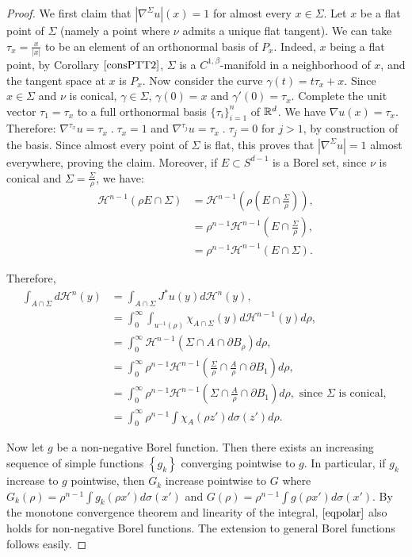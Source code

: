 \documentclass[11pt]{article}
\theoremstyle{definition}
\theoremstyle{remark}
\numberwithin{equation}{section}
\begin{document}
\begin{proof}
We first claim that $|\nabla^{\Sigma}u|(x)=1$ for almost every $x \in \Sigma$. Let $x$ be a flat point of $\Sigma$ (namely a point where $\nu$ admits a unique flat tangent). We can take $\tau_x=\frac{x}{|x|}$ to be an element of an orthonormal basis of $P_x$. Indeed, $x$ being a flat point, by Corollary $\ref{consPTT2}$, $\Sigma$ is a $C^{1,\beta}$-manifold in a neighborhood of $x$, and the tangent space at $x$ is $P_x$. 
Now consider the curve $\gamma(t)=t \tau_x +x$. 
Since $x \in \Sigma$ and $\nu$ is conical, $\gamma \in \Sigma$, $\gamma(0)=x$ and $\gamma'(0)=\tau_x$.
Complete the unit vector $\tau_1=\tau_{x}$ to a full orthonormal basis $\{\tau_i\}_{i=1}^{n}$ of $\mathbb{R}^{d}$. We have $\nabla u(x)= \tau_x$. Therefore: $\nabla^{\tau_x} u = \tau_x \;.\; \tau_x =1$ and $\nabla^{\tau_j} u = \tau_x \; . \; \tau_j = 0$ for $j>1$, by construction of the basis.  Since almost every point of $\Sigma$ is flat, this proves that $|\nabla^{\Sigma}u|= 1$ almost everywhere, proving the claim.
 Moreover, if $E \subset S^{d-1}$ is a Borel set, since $\nu$ is conical and $\Sigma= \frac{\Sigma}{\rho}$, we have:
 \begin{align}\label{Hausdorffdilation}
 \mathcal{H}^{n-1}(\rho E \cap \Sigma) & = \mathcal{H}^{n-1}\left(\rho\left(E \cap \frac{\Sigma}{\rho}\right)\right), \nonumber \\
 &=\rho^{n-1} \mathcal{H}^{n-1}\left(E \cap \frac{\Sigma}{\rho}\right), \\
 &= \rho^{n-1} \mathcal{H}^{n-1}\left(E \cap \Sigma\right). \nonumber
 \end{align}
 
Therefore,
\begin{align}
\label{polarsubstep1.1}
\int_{A \cap \Sigma}  d\mathcal{H}^{n}(y)
&=\int_{A \cap \Sigma} J^{*}u(y) d\mathcal{H}^{n}(y), \nonumber\\
& =\int_{0}^{\infty}  \int_{u^{-1}(\rho)} \chi_{A \cap \Sigma}(y) d\mathcal{H}^{n-1} (y) d\rho \nonumber,\\
&=\int_{0}^{\infty} \mathcal{H}^{n-1}(\Sigma \cap A \cap {{\partial B}_{\rho}}) d\rho,\\
&=\int_{0}^{\infty} \rho^{n-1} \mathcal{H}^{n-1}(\frac{\Sigma}{\rho} \cap \frac{A}{\rho} \cap {{\partial B}_{1}}) d\rho ,\nonumber \\
&=\int_{0}^{\infty} \rho^{n-1} \mathcal{H}^{n-1}(\Sigma \cap \frac{A}{\rho} \cap {{\partial B}_{1}} )d \rho , \text{ since } \Sigma \text{ is conical, } \nonumber \\
&=\int_{0}^{\infty} \rho^{n-1} \int \chi_{A}(\rho z') d\sigma(z') d\rho . \nonumber
\end{align}

Now let $g$ be a non-negative Borel function. Then there exists an increasing sequence of simple functions $\left\lbrace g_k \right\rbrace$ converging pointwise to $g$. In particular, if $g_k$ increase to $g$ pointwise, then $G_k$ increase pointwise to $G$ where $G_k (\rho) = \rho^{n-1}\int g_{k}(\rho x') d\sigma(x')$ and $G(\rho) = \rho^{n-1}\int g(\rho x') d\sigma(x')$. By the monotone convergence theorem and linearity of the integral, $\eqref{eqpolar}$ also holds for non-negative Borel functions. The extension to general Borel functions follows easily.
\end{proof}
\end{document}
